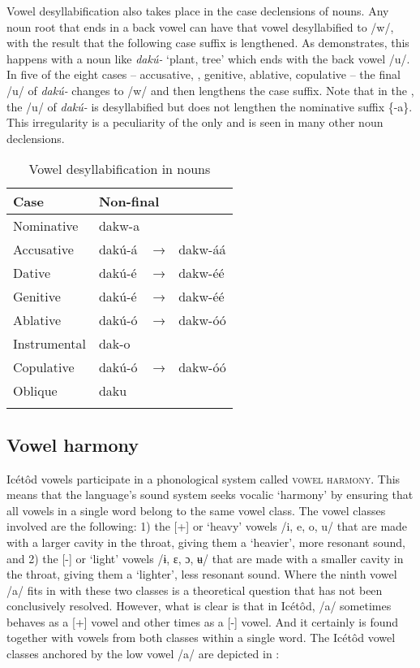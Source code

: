 Vowel desyllabification also takes place in the case declensions of nouns. Any noun root that ends in a back vowel can have that vowel desyllabified to /w/, with the result that the following case suffix is lengthened. As  demonstrates, this happens with a noun like \textit{dakú-} ‘plant, tree’ which ends with the back vowel /u/. In five of the eight cases – accusative, , genitive, ablative, copulative – the final /u/ of \textit{dakú-} changes to /w/ and then lengthens the case suffix. Note that in the , the /u/ of \textit{dakú-} is desyllabified but does not lengthen the nominative suffix \{-a\}. This irregularity is a peculiarity of the  only and is seen in many other noun declensions.


\begin{table}
\caption{Vowel desyllabification in nouns}
\label{tab:phon:desyllabn}


\begin{tabularx}{\textwidth}{XXXX}
\lsptoprule

Case & \multicolumn{3}{X}{ Non-final}\\
\midrule
Nominative & dakw-a &  & \\
Accusative & dakú-á & → & dakw-áá\\
Dative & dakú-é & → & dakw-éé\\
Genitive & dakú-é & → & dakw-éé\\
Ablative & dakú-ó & → & dakw-óó\\
Instrumental & dak-o &  & \\
Copulative & dakú-ó & → & dakw-óó\\
Oblique & daku &  & \\
\lspbottomrule
\end{tabularx}
\end{table}

\subsection{Vowel harmony}\label{sec:2.5}


Icétôd vowels participate in a phonological system called \textsc{vowel harmony}. This means that the language’s sound system seeks vocalic ‘harmony’ by ensuring that all vowels in a single word belong to the same vowel class. The vowel classes involved are the following: 1) the [+] or ‘heavy’ vowels /i, e, o, u/ that are made with a larger cavity in the throat, giving them a ‘heavier’, more resonant sound, and 2) the [-] or ‘light’ vowels /ɨ, ɛ, ɔ, ʉ/ that are made with a smaller cavity in the throat, giving them a ‘lighter’, less resonant sound. Where the ninth vowel /a/ fits in with these two classes is a theoretical question that has not been conclusively resolved. However, what is clear is that in Icétôd, /a/ sometimes behaves as a [+] vowel and other times as a [-] vowel. And it certainly is found together with vowels from both classes within a single word. The Icétôd vowel classes anchored by the low vowel /a/ are depicted in :


